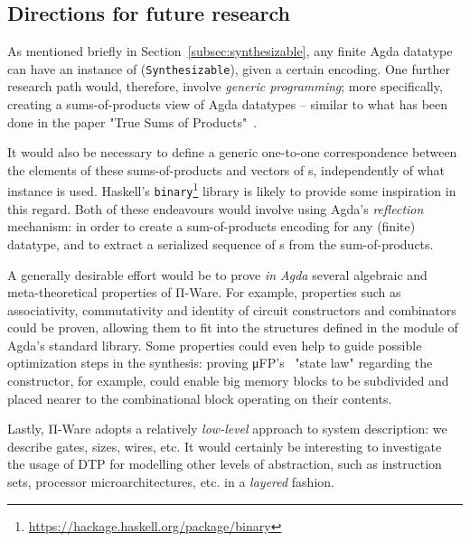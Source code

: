             \newpage

        \subsection{Directions for future research}
        \label{subsec:future-research}
            As mentioned briefly in Section~\ref{subsec:synthesizable}, any finite Agda datatype can have
            an instance of  (\texttt{Synthesizable}), given a certain encoding.
            One further research path would, therefore, involve \emph{generic programming};
            more specifically, creating a sums-of-products view of Agda datatypes – similar to
            what has been done in the paper "True Sums of Products"~\cite{true-sop}.

            It would also be necessary to define a generic one-to-one correspondence
            between the elements of these sums-of-products and vectors of s,
            independently of what  instance is used.
            Haskell's \texttt{binary}\footnote{\url{https://hackage.haskell.org/package/binary}}
            library is likely to provide some inspiration in this regard.
            Both of these endeavours would involve using Agda's
            \emph{reflection}~\cite{engineering-reflection-agda} mechanism:
            in order to create a sum-of-products encoding for any (finite) datatype,
            and to extract a serialized sequence of s from the sum-of-products.

            A generally desirable effort would be to prove \emph{in Agda} several
            algebraic and meta-theoretical properties of Π-Ware.
            For example, properties such as associativity, commutativity and identity of
            circuit constructors and combinators could be proven, allowing them to fit into
            the structures defined in the  module of Agda's standard library.
            Some properties could even help to guide possible optimization steps in the synthesis:
            proving μFP's~\cite{mufp-1984} "state law" regarding the  constructor,
            for example, could enable big memory blocks to be subdivided and placed nearer
            to the combinational block operating on their contents.

            Lastly, Π-Ware adopts a relatively \emph{low-level} approach to system description:
            we describe gates, sizes, wires, etc. It would certainly be interesting to investigate
            the usage of \acl{DTP} for modelling other levels of abstraction, such as
            instruction sets, processor microarchitectures, etc. in a \emph{layered} fashion.
